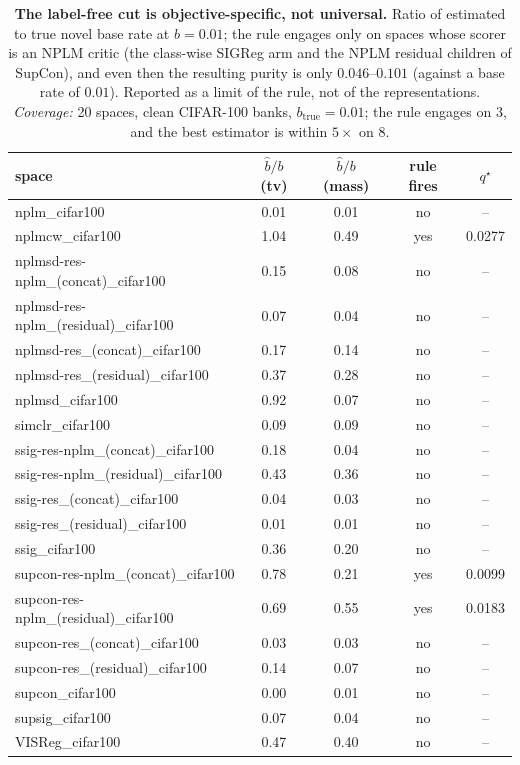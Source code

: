 \begin{table}[t]
\centering
\small
\begin{tabular}{lcccc}
\toprule
space & $\hat b/b$ (tv) & $\hat b/b$ (mass) & rule fires & $q^\star$ \\
\midrule
nplm\_cifar100 & 0.01 & 0.01 & no & -- \\
nplmcw\_cifar100 & 1.04 & 0.49 & yes & 0.0277 \\
nplmsd-res-nplm\_(concat)\_cifar100 & 0.15 & 0.08 & no & -- \\
nplmsd-res-nplm\_(residual)\_cifar100 & 0.07 & 0.04 & no & -- \\
nplmsd-res\_(concat)\_cifar100 & 0.17 & 0.14 & no & -- \\
nplmsd-res\_(residual)\_cifar100 & 0.37 & 0.28 & no & -- \\
nplmsd\_cifar100 & 0.92 & 0.07 & no & -- \\
simclr\_cifar100 & 0.09 & 0.09 & no & -- \\
ssig-res-nplm\_(concat)\_cifar100 & 0.18 & 0.04 & no & -- \\
ssig-res-nplm\_(residual)\_cifar100 & 0.43 & 0.36 & no & -- \\
ssig-res\_(concat)\_cifar100 & 0.04 & 0.03 & no & -- \\
ssig-res\_(residual)\_cifar100 & 0.01 & 0.01 & no & -- \\
ssig\_cifar100 & 0.36 & 0.20 & no & -- \\
supcon-res-nplm\_(concat)\_cifar100 & 0.78 & 0.21 & yes & 0.0099 \\
supcon-res-nplm\_(residual)\_cifar100 & 0.69 & 0.55 & yes & 0.0183 \\
supcon-res\_(concat)\_cifar100 & 0.03 & 0.03 & no & -- \\
supcon-res\_(residual)\_cifar100 & 0.14 & 0.07 & no & -- \\
supcon\_cifar100 & 0.00 & 0.01 & no & -- \\
supsig\_cifar100 & 0.07 & 0.04 & no & -- \\
VISReg\_cifar100 & 0.47 & 0.40 & no & -- \\
\bottomrule
\end{tabular}
\caption{\textbf{The label-free cut is objective-specific, not universal.} Ratio of estimated to true novel base rate at $b{=}0.01$; the rule engages only on spaces whose scorer is an NPLM critic (the class-wise SIGReg arm and the NPLM residual children of SupCon), and even then the resulting purity is only $0.046$--$0.101$ (against a base rate of $0.01$). Reported as a limit of the rule, not of the representations. \emph{Coverage:} 20 spaces, clean CIFAR-100 banks, $b_{\text{true}}{=}0.01$; the rule engages on 3, and the best estimator is within $5\times$ on 8.}
\label{tab:baserate}
\end{table}
